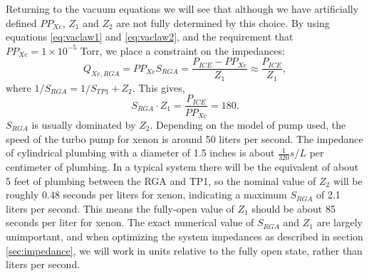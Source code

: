 \documentclass[12pt]{article}
\begin{document}
Returning to the vacuum equations we will see that although we have artificially defined $PP_{Xe}$, $Z_1$ and $Z_2$ are not fully determined by this choice. By using equations \ref{eq:vaclaw1} and \ref{eq:vaclaw2}, and the requirement that $PP_{Xe}=1\times 10^{-5}$ Torr, we place a constraint on the impedances:
\begin{equation}
\label{eq:xepres1}
Q_{Xe,RGA}=PP_{Xe}S_{RGA}=\frac{P_{ICE}-PP_{Xe}}{Z_1}\approx \frac{P_{ICE}}{Z_1},
\end{equation}
where $1/S_{RGA}=1/S_{TP1}+Z_2$. This gives,
\begin{equation}
\label{eq:impconstraint}
S_{RGA}\cdot Z_1= \frac{P_{ICE}}{PP_{Xe}} = 180.
\end{equation}
$S_{RGA}$ is usually dominated by $Z_2$. Depending on the model of pump used, the speed of the turbo pump for xenon is around 50 liters per second. The impedance of cylindrical plumbing with a diameter of 1.5 inches is about $\frac{1}{320} s/L$ per centimeter of plumbing.\cite{vac_eq} In a typical system there will be the equivalent of about 5 feet of plumbing between the RGA and TP1, so the nominal value of $Z_2$ will be roughly 0.48 seconds per liters for xenon, indicating a maximum $S_{RGA}$ of 2.1 liters per second.\cite{vac_eq} This means the fully-open value of $Z_1$ should be about 85 seconds per liter for xenon. The exact numerical value of $S_{RGA}$ and $Z_1$ are largely unimportant, and when optimizing the system impedances as described in section \ref{sec:impedance}, we will work in units relative to the fully open state, rather than liters per second.
\end{document}
